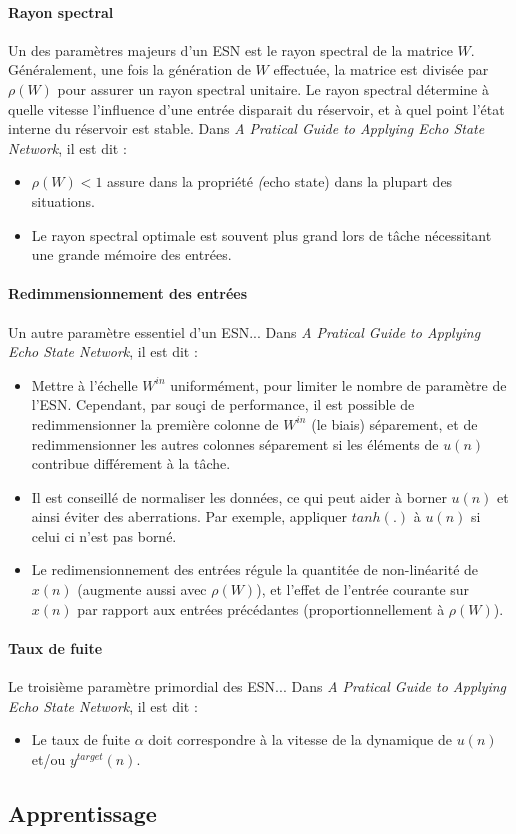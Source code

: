 \documentclass[12pt]{article}
\begin{document}
\paragraph{Rayon spectral}
Un des paramètres majeurs d'un ESN est le rayon spectral de la matrice $W$. Généralement, une fois la génération de $W$ effectuée, la matrice est divisée par $\rho(W)$ pour assurer un rayon spectral unitaire. Le rayon spectral détermine à quelle vitesse l'influence d'une entrée disparait du réservoir, et à quel point l'état interne du réservoir est stable.\newline
Dans \textit{A Pratical Guide to Applying Echo State Network}, il est dit :
\begin{itemize}
\item $\rho(W) < 1$ assure dans la propriété \textit(echo state) dans la plupart des situations.
\item Le rayon spectral optimale est souvent plus grand lors de tâche nécessitant une grande mémoire des entrées.
\end{itemize}

\paragraph{Redimmensionnement des entrées}
Un autre paramètre essentiel d'un ESN... \newline
Dans \textit{A Pratical Guide to Applying Echo State Network}, il est dit :
\begin{itemize}
\item Mettre à l'échelle $W^{in}$ uniformément, pour limiter le nombre de paramètre de l'ESN. Cependant, par souçi de performance, il est possible de redimmensionner la première colonne de $W^{in}$ (le biais) séparement, et de redimmensionner les autres colonnes séparement si les éléments de $u(n)$ contribue différement à la tâche.
\item Il est conseillé de normaliser les données, ce qui peut aider à borner $u(n)$ et ainsi éviter des aberrations. Par exemple, appliquer $tanh(.)$ à $u(n)$ si celui ci n'est pas borné.
\item Le redimensionnement des entrées régule la quantitée de non-linéarité de $x(n)$ (augmente aussi avec $\rho(W)$), et l'effet de l'entrée courante sur $x(n)$ par rapport aux entrées précédantes (proportionnellement à $\rho(W)$).
\end{itemize}

\paragraph{Taux de fuite}
Le troisième paramètre primordial des ESN...\newline
Dans \textit{A Pratical Guide to Applying Echo State Network}, il est dit :
\begin{itemize}
\item Le taux de fuite $\alpha$ doit correspondre à la vitesse de la dynamique de $u(n)$ et/ou $y^{target}(n)$.
\end{itemize}

\subsection{Apprentissage}
\end{document}
